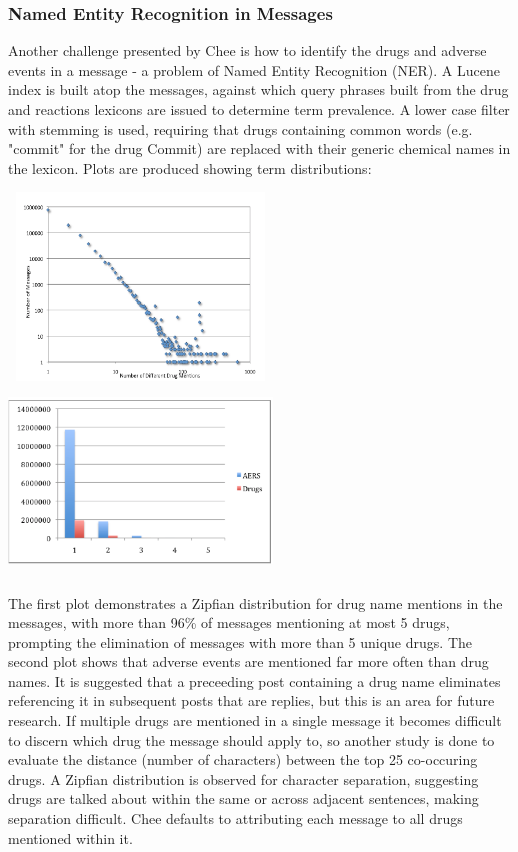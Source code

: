 \documentclass[twoside,11pt]{article}
\begin{document}
\subsubsection{Named Entity Recognition in Messages}
Another challenge presented by Chee is how to identify the drugs and adverse events in a message - a problem of Named Entity Recognition (NER). A Lucene index is built atop the messages, against which query phrases built from the drug and reactions lexicons are issued to determine term prevalence. A lower case filter with stemming is used, requiring that drugs containing common words (e.g. "commit" for the drug Commit) are replaced with their generic chemical names in the lexicon. Plots are produced showing term distributions:

\includegraphics[width=7cm, height=5cm]{Figure-1-Zipfian.png}
\includegraphics[width=7cm, height=5cm]{Figure-2-AERS_Drugs.png}

The first plot demonstrates a Zipfian distribution for drug name mentions in the messages, with more than 96\% of messages mentioning at most 5 drugs, prompting the elimination of messages with more than 5 unique drugs. The second plot shows that adverse events are mentioned far more often than drug names. It is suggested that a preceeding post containing a drug name eliminates referencing it in subsequent posts that are replies, but this is an area for future research. If multiple drugs are mentioned in a single message it becomes difficult to discern which drug the message should apply to, so another study is done to evaluate the distance (number of characters) between the top 25 co-occuring drugs. A Zipfian distribution is observed for character separation, suggesting drugs are talked about within the same or across adjacent sentences, making separation difficult. Chee defaults to attributing each message to all drugs mentioned within it.
\end{document}
